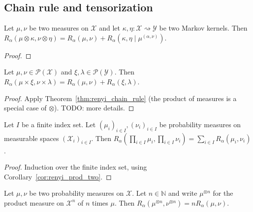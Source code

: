 \subsection{Chain rule and tensorization}

\begin{theorem}
  \label{thm:renyi_chain_rule}
  Let $\mu, \nu$ be two measures on $\mathcal X$ and let $\kappa, \eta : \mathcal X \rightsquigarrow \mathcal Y$ be two Markov kernels.
  Then $R_\alpha(\mu \otimes \kappa, \nu \otimes \eta) = R_\alpha(\mu, \nu) + R_\alpha(\kappa, \eta \mid \mu^{(\alpha, \nu)})$.
\end{theorem}

\begin{proof}%
{}
\end{proof}

\begin{corollary}
  \label{cor:renyi_prod_two}
  Let $\mu, \nu \in \mathcal P(\mathcal X)$ and $\xi, \lambda \in \mathcal P(\mathcal Y)$.
  Then $R_\alpha(\mu \times \xi, \nu \times \lambda) = R_\alpha(\mu, \nu) + R_\alpha(\xi, \lambda)$.
\end{corollary}

\begin{proof}%
{}
Apply Theorem~\ref{thm:renyi_chain_rule} (the product of measures is a special case of $\otimes$). TODO: more details.
\end{proof}

\begin{theorem}
  \label{thm:renyi_prod}
  Let $I$ be a finite index set. Let $(\mu_i)_{i \in I}, (\nu_i)_{i \in I}$ be probability measures on measurable spaces $(\mathcal X_i)_{i \in I}$.
  Then $R_\alpha (\prod_{i \in I} \mu_i, \prod_{i \in I} \nu_i) = \sum_{i \in I} R_\alpha(\mu_i, \nu_i)$.
\end{theorem}

\begin{proof}%
{}
Induction over the finite index set, using Corollary~\ref{cor:renyi_prod_two}.
\end{proof}

\begin{corollary}
  \label{lem:renyi_prod_n}
  Let $\mu, \nu$ be two probability measures on $\mathcal X$. Let $n \in \mathbb{N}$ and write $\mu^{\otimes n}$ for the product measure on $\mathcal X^n$ of $n$ times $\mu$.
  Then $R_\alpha(\mu^{\otimes n}, \nu^{\otimes n}) = n R_\alpha(\mu, \nu)$.
\end{corollary}

